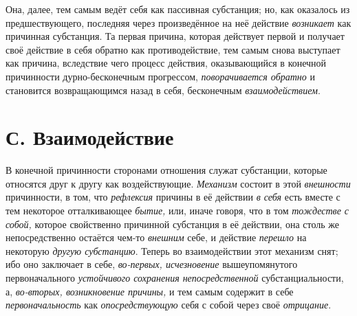 Она, далее, тем самым ведёт себя как пассивная субстанция; но, как оказалось
из предшествующего, последняя через произведённое на неё действие
{\em возникает} как причинная субстанция. Та первая
причина, которая действует первой и получает своё действие в себя обратно
как противодействие, тем самым снова выступает как причина, вследствие чего
процесс действия, оказывающийся в конечной причинности дурно-бесконечным
прогрессом, {\em поворачивается обратно} и становится
возвращающимся назад в себя, бесконечным {\em взаимодействием}.


\section[С. Взаимодействие]{С. Взаимодействие}

В конечной причинности сторонами отношения
служат субстанции, которые относятся друг к другу как воздействующие.
{\em Механизм} состоит в этой {\em внешности} причинности, в том, что
{\em рефлексия} причины в её действии
{\em в себя} есть вместе с тем некоторое отталкивающее
{\em бытие,} или, иначе говоря, что в том
{\em тождестве с собой,} которое свойственно причинной
субстанция в её действии, она столь же непосредственно остаётся чем-то
{\em внешним} себе, и действие {\em перешло} на некоторую
{\em другую субстанцию}. Теперь во взаимодействии этот
механизм снят; ибо оно заключает в себе, {\em во-первых, исчезновение}
вышеупомянутого первоначального {\em устойчивого
сохранения непосредственной} субстанциальности, а,
{\em во-вторых, возникновение причины,} и тем самым содержит в себе
{\em первоначальность} как {\em опосредствующую} себя с собой через своё
{\em отрицание}.

